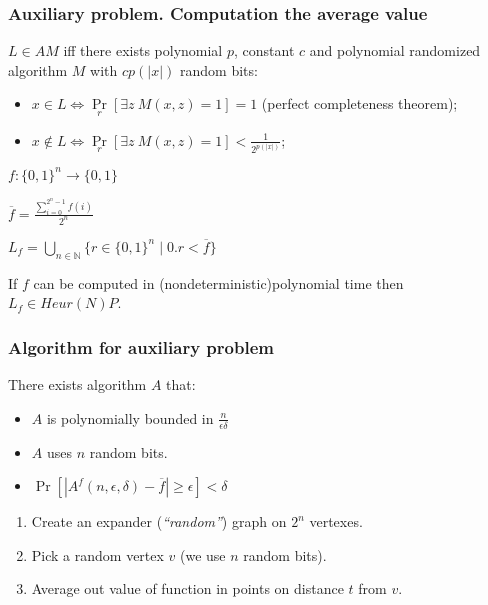 \begin{frame}
    \frametitle{Auxiliary problem. Computation the average value}

    \begin{theorem}
        $L \in AM$ iff there exists polynomial $p$, constant $c$ and
        polynomial randomized algorithm $M$ with $c p(|x|)$ random
        bits:
        \begin{itemize}
			\item $x \in L \Leftrightarrow
        		\Pr\limits_{r}[\exists z~ M(x, z) = 1] = 1$
                (perfect completeness theorem);
            \item $x \notin L \Leftrightarrow
        		\Pr\limits_{r}[\exists z~ M(x, z) = 1] 
        		< \frac{1}{2^{p(|x|)}}$;
        \end{itemize}
    \end{theorem}

    \pause
    $f:\{0, 1\}^{n} \rightarrow \{0, 1\}$
    
    $\overline{f} = \frac{\sum\limits_{i = 0}^{2^n - 1}f(i)}{2^n}$

    $L_f = \bigcup\limits_{n \in \mathbb{N}}\{r \in \{0, 1\}^n \mid 0.r < \overline{f}\}$

    \begin{lemma}
        If $f$ can be computed in (nondeterministic)polynomial time then $L_f \in Heur(N)P$.
    \end{lemma}

\end{frame}


\begin{frame}
    \frametitle{Algorithm for auxiliary problem}

    \begin{statement}[Goldreich]
        There exists algorithm $A$ that:
        \begin{itemize}
	        \item $A$ is polynomially bounded in $\frac{n}{\epsilon\delta}$
        	\item $A$ uses $n$ random bits.
        	\item $\Pr[|A^{f}(n, \epsilon, \delta) - \overline{f}| \ge \epsilon] <
		        \delta$
        \end{itemize}
    \end{statement}

    \begin{enumerate}
 		\item Create an expander ({\it ``random''}) graph on $2^n$ vertexes.
    	\item Pick a random vertex $v$ (we use $n$ random bits).
    	\item Average out value of function in points on distance $t$ from $v$.
    \end{enumerate}
    
\end{frame}

